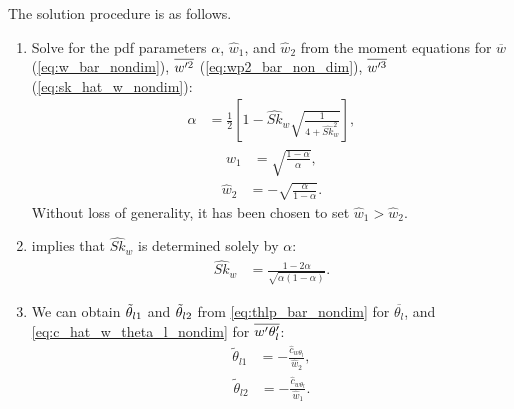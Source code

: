 The solution procedure is as follows.
\begin{enumerate}
    \item Solve for the \gls{pdf} parameters $\alpha$, $\widehat{w}_1$,
    and $\widehat{w}_2$ from the moment equations for $\overline{w}$ (\cref{eq:w_bar_nondim}),
    $\overline{w'^2}$ (\cref{eq:wp2_bar_non_dim}), $\overline{w'^3}$ (\cref{eq:sk_hat_w_nondim}):
    \begin{align}
        \label{eq:alpha_solved}
        \alpha
        &= \frac{1}{2}\left[1 - \widehat{Sk}_w \sqrt{\frac{1}{4 + \widehat{Sk}_w^2}}\right],
    \end{align}
    \begin{align}
        \label{eq:w1_solved}
        \widehat{w}_1
        &= \sqrt{\frac{1-\alpha}{\alpha}},
    \end{align}
    \begin{align}
        \label{eq:w2_solved}
        \widehat{w}_2
        &= -\sqrt{\frac{\alpha}{1-\alpha}}.
    \end{align}
    Without loss of generality, it has been chosen to set $\widehat{w}_1 > \widehat{w}_2$.

    \item {} implies that $\widehat{Sk}_w$ is determined solely by $\alpha$:
    \begin{align}
        \label{eq:sk_w_alpha}
        \widehat{Sk}_w
        &= \frac{1-2\alpha}{\sqrt{\alpha(1-\alpha)}}.
    \end{align}

    \item We can obtain $\Tilde{\theta}_{l1}$ and $\Tilde{\theta}_{l2}$ from \cref{eq:thlp_bar_nondim}
    for $\overline{\theta_l}$, and \cref{eq:c_hat_w_theta_l_nondim} for $\overline{w' \theta_l'}$:
    \begin{align}
        \label{eq:thl1_tilde_solved}
        \tilde{\theta}_{l1}
        &= -\frac{\widehat{c}_{w \theta_l}}{\widehat{w}_2},
    \end{align}
    \begin{align}
        \label{eq:thl2_tilde_solved}
        \tilde{\theta}_{l2}
        &= -\frac{\widehat{c}_{w \theta_l}}{\widehat{w}_1}.
    \end{align}


\end{enumerate}
